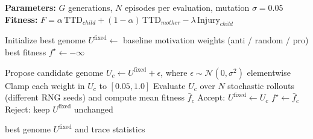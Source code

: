 \begin{algorithm}[H]
\caption{Single-lineage $(1{+}1)$ evolutionary search (implementation)}
\begin{algorithmic}[1]
\State \textbf{Parameters:} $G$ generations, $N$ episodes per evaluation, mutation $\sigma=0.05$
\State \textbf{Fitness:} $F=\alpha\,\mathrm{TTD}_{child} + (1-\alpha)\,\mathrm{TTD}_{mother} - \lambda\,\mathrm{Injury}_{child}$

\State Initialize best genome $U^{\text{fixed}} \gets$ baseline motivation weights (anti / random / pro)
\State best fitness $f^\star \gets -\infty$

    \State Propose candidate genome $U_c \gets U^{\text{fixed}} + \epsilon$, where $\epsilon \sim \mathcal{N}(0,\sigma^2)$ elementwise
    \State Clamp each weight in $U_c$ to $[0.05,1.0]$
    \State Evaluate $U_c$ over $N$ stochastic rollouts (different RNG seeds) and compute mean fitness $\bar f_c$
        \State Accept: $U^{\text{fixed}} \gets U_c$
        \State $f^\star \gets \bar f_c$
    \Else
        \State Reject: keep $U^{\text{fixed}}$ unchanged
    \EndIf
\EndFor

\State \Return best genome $U^{\text{fixed}}$ and trace statistics
\end{algorithmic}
\end{algorithm}